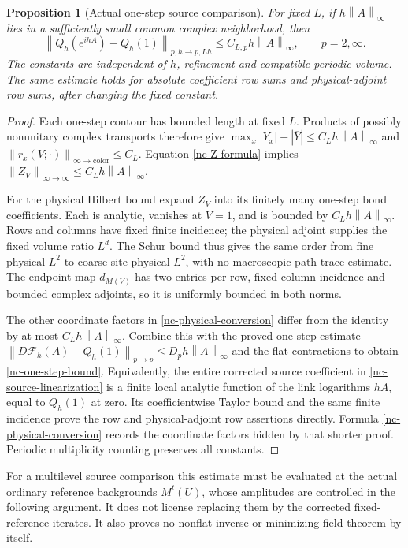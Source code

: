 \documentclass[11pt]{article}
\newtheorem{proposition}[theorem]{Proposition}
\theoremstyle{remark}\newtheorem{remark}[theorem]{Remark}
\newcommand{\norm}[1]{\left\lVert#1\right\rVert}
\begin{document}
\begin{proposition}[Actual one-step source comparison]
\label{nc-one-step-proposition}
For fixed $L$, if $h\norm{A}_\infty$ lies in a sufficiently small
common complex neighborhood, then
\begin{equation}
 \norm{Q_h(e^{ihA})-Q_h(1)}_{p,h\to p,Lh}
     \le C_{L,p}h\norm{A}_\infty,
 \qquad p=2,\infty.
 \label{nc-one-step-bound}
\end{equation}
The constants are independent of $h$, refinement and compatible
periodic volume. The same estimate holds for absolute coefficient
row sums and physical-adjoint row sums, after changing the fixed
constant.
\end{proposition}

\begin{proof}
Each one-step contour has bounded length at fixed $L$. Products of
possibly nonunitary complex transports therefore give
$\max_x|Y_x|+|\overline Y|\le C_Lh\norm{A}_\infty$ and
$\norm{r_x(V;\cdot)}_{\infty\to\mathrm{color}}\le C_L$.
Equation \eqref{nc-Z-formula} implies
$\norm{Z_V}_{\infty\to\infty}\le C_Lh\norm{A}_\infty$.

For the physical Hilbert bound expand $Z_V$ into its finitely many
one-step bond coefficients. Each is analytic, vanishes at $V=1$,
and is bounded by $C_Lh\norm{A}_\infty$. Rows and columns have
fixed finite incidence; the physical adjoint supplies the fixed
volume ratio $L^d$. The Schur bound thus gives the same order
from fine physical $L^2$ to coarse-site physical $L^2$, with no
macroscopic path-trace estimate. The endpoint map $d_{M(V)}$ has
two entries per row, fixed column incidence and bounded complex
adjoints, so it is uniformly bounded in both norms.

The other coordinate factors in \eqref{nc-physical-conversion}
differ from the identity by at most $C_Lh\norm{A}_\infty$.
Combine this with the proved one-step estimate
$\norm{D\mathcal F_h(A)-Q_h(1)}_{p\to p}
\le D_ph\norm{A}_\infty$ and the flat contractions to obtain
\eqref{nc-one-step-bound}. Equivalently, the entire corrected
source coefficient in \eqref{nc-source-linearization} is a finite
local analytic function of the link logarithms $hA$, equal to
$Q_h(1)$ at zero. Its coefficientwise Taylor bound and the same
finite incidence prove the row and physical-adjoint row assertions
directly. Formula \eqref{nc-physical-conversion} records the
coordinate factors hidden by that shorter proof. Periodic
multiplicity counting preserves all constants.
\end{proof}

For a multilevel source comparison this estimate must be evaluated
at the actual ordinary reference backgrounds $M^t(U)$, whose
amplitudes are controlled in the following argument. It does not
license replacing them by the corrected fixed-reference iterates.
It also proves no nonflat inverse or minimizing-field theorem by
itself.
\end{document}
